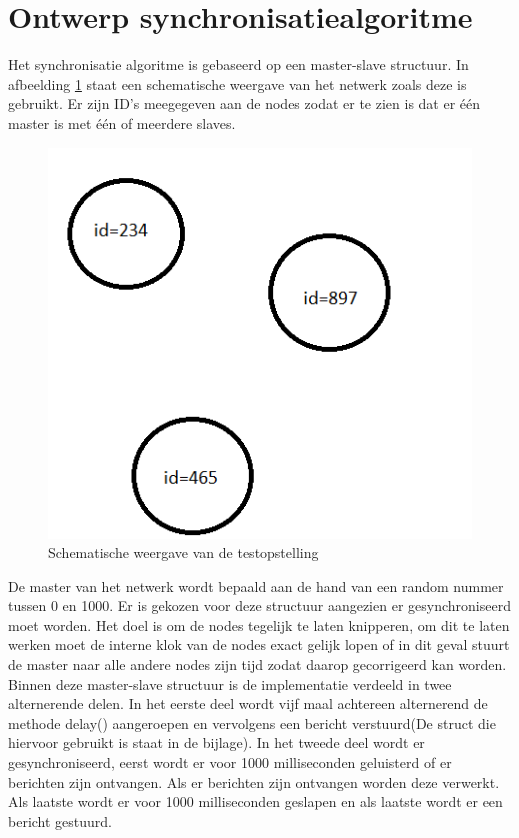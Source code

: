 \documentclass{article}
\begin{document}
\section{Ontwerp synchronisatiealgoritme}
Het synchronisatie algoritme is gebaseerd op een master-slave structuur. In afbeelding \ref{fig: Schematisch} staat een schematische weergave van het netwerk zoals deze is gebruikt. Er zijn ID's meegegeven aan de nodes zodat er te zien is dat er \'{e}\'{e}n master is met \'{e}\'{e}n of meerdere slaves. 
\begin{figure}[h]
\centering\includegraphics[scale=0.5]{testopstelling}
\caption{Schematische weergave van de testopstelling}
\label{fig: Schematisch}
\end{figure}
De master van het netwerk wordt bepaald aan de hand van een random nummer tussen 0 en 1000. Er is gekozen voor deze structuur aangezien er gesynchroniseerd moet worden. Het doel is om de nodes tegelijk te laten knipperen, om dit te laten werken moet de interne klok van de nodes exact gelijk lopen of in dit geval stuurt de master naar alle andere nodes zijn tijd zodat daarop gecorrigeerd kan worden. Binnen deze master-slave structuur is de implementatie verdeeld in twee alternerende delen.
In het eerste deel wordt vijf maal achtereen alternerend de methode delay() aangeroepen en vervolgens een bericht verstuurd(De struct die hiervoor gebruikt is staat in de bijlage).
In het tweede deel wordt er gesynchroniseerd, eerst wordt er voor 1000 milliseconden geluisterd of er berichten zijn ontvangen. Als er berichten zijn ontvangen worden deze verwerkt. Als laatste wordt er voor 1000 milliseconden geslapen en als laatste wordt er een bericht gestuurd. 
\end{document}
